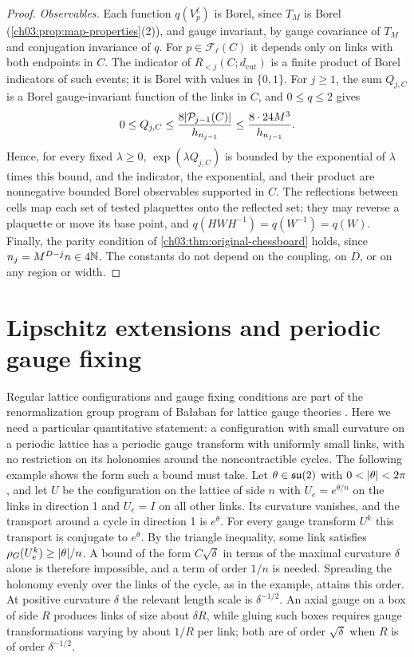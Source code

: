 \begin{proof}
\emph{Observables.} Each function $q(V^\ell_p)$ is Borel, since $T_M$ is Borel (\cref{ch03:prop:map-properties}(2)), and gauge invariant, by gauge covariance of $T_M$ and conjugation invariance of $q$. For $p\in\mathcal F_\ell(C)$ it depends only on links with both endpoints in $C$. The indicator of $R_{<j}(C;d_{\mathrm{cut}})$ is a finite product of Borel indicators of such events; it is Borel with values in $\{0,1\}$. For $j\ge1$, the sum $Q_{j,C}$ is a Borel gauge-invariant function of the links in $C$, and $0\le q\le2$ gives
\begin{equation}\label{ch04:eq:bounded-cell-tests}
 0\le Q_{j,C}\le\frac{8\lvert \mathcal P_{j-1}(C)\rvert}{h_{n_{j-1}}}\le\frac{8\cdot24M^3}{h_{n_{j-1}}}.
\end{equation}
Hence, for every fixed $\lambda\ge0$, $\exp(\lambda Q_{j,C})$ is bounded by the exponential of $\lambda$ times this bound, and the indicator, the exponential, and their product are nonnegative bounded Borel observables supported in $C$. The reflections between cells map each set of tested plaquettes onto the reflected set; they may reverse a plaquette or move its base point, and $q(HWH^{-1})=q(W^{-1})=q(W)$. Finally, the parity condition of \cref{ch03:thm:original-chessboard} holds, since $n_j=M^{D-j}n\in4\mathbb N$. The constants do not depend on the coupling, on $D$, or on any region or width.
\end{proof}

\section{Lipschitz extensions and periodic gauge fixing}\label{ch04:sec:gauge}

Regular lattice configurations and gauge fixing conditions are part of the renormalization group program of Bałaban for lattice gauge theories \cite{Balaban1985Regular}. Here we need a particular quantitative statement: a configuration with small curvature on a periodic lattice has a periodic gauge transform with uniformly small links, with no restriction on its holonomies around the noncontractible cycles. The following example shows the form such a bound must take. Let $\theta\in\mathfrak{su}(2)$ with $0<\lvert \theta\rvert<2\pi$, and let $U$ be the configuration on the lattice of side $n$ with $U_e=e^{\theta/n}$ on the links in direction 1 and $U_e=I$ on all other links. Its curvature vanishes, and the transport around a cycle in direction 1 is $e^\theta$. For every gauge transform $U^k$ this transport is conjugate to $e^\theta$. By the triangle inequality, some link satisfies $\rho_G(U^k_e)\ge\lvert \theta\rvert/n$. A bound of the form $C\sqrt\delta$ in terms of the maximal curvature $\delta$ alone is therefore impossible, and a term of order $1/n$ is needed. Spreading the holonomy evenly over the links of the cycle, as in the example, attains this order. At positive curvature $\delta$ the relevant length scale is $\delta^{-1/2}$. An axial gauge on a box of side $R$ produces links of size about $\delta R$, while gluing such boxes requires gauge transformations varying by about $1/R$ per link; both are of order $\sqrt\delta$ when $R$ is of order $\delta^{-1/2}$.

